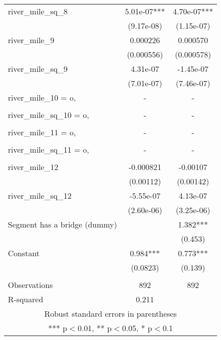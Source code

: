\begin{tabular}{lcc}
river\_mile\_sq\_8 & 5.01e-07*** & 4.70e-07*** \\
 & (9.17e-08) & (1.15e-07) \\
river\_mile\_9 & 0.000226 & 0.000570 \\
 & (0.000556) & (0.000578) \\
river\_mile\_sq\_9 & 4.31e-07 & -1.45e-07 \\
 & (7.01e-07) & (7.46e-07) \\
river\_mile\_10 = o, & - & - \\
 &  &  \\
river\_mile\_sq\_10 = o, & - & - \\
 &  &  \\
river\_mile\_11 = o, & - & - \\
 &  &  \\
river\_mile\_sq\_11 = o, & - & - \\
 &  &  \\
river\_mile\_12 & -0.000821 & -0.00107 \\
 & (0.00112) & (0.00142) \\
river\_mile\_sq\_12 & -5.55e-07 & 4.13e-07 \\
 & (2.60e-06) & (3.25e-06) \\
Segment has a bridge (dummy) &  & 1.382*** \\
 &  & (0.453) \\
Constant & 0.984*** & 0.773*** \\
 & (0.0823) & (0.139) \\
 &  &  \\
Observations & 892 & 892 \\
 R-squared & 0.211 &  \\ \hline
\multicolumn{3}{c}{ Robust standard errors in parentheses} \\
\multicolumn{3}{c}{ *** p$<$0.01, ** p$<$0.05, * p$<$0.1} \\
\end{tabular}
